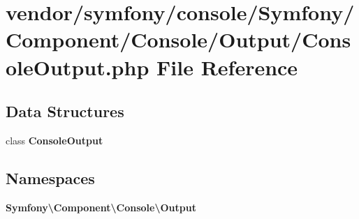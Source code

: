 \section{vendor/symfony/console/\+Symfony/\+Component/\+Console/\+Output/\+Console\+Output.php File Reference}
\label{_console_output_8php}
\subsection*{Data Structures}
\begin{DoxyCompactItemize}
\item 
class {\bf Console\+Output}
\end{DoxyCompactItemize}
\subsection*{Namespaces}
\begin{DoxyCompactItemize}
\item 
 {\bf Symfony\textbackslash{}\+Component\textbackslash{}\+Console\textbackslash{}\+Output}
\end{DoxyCompactItemize}
